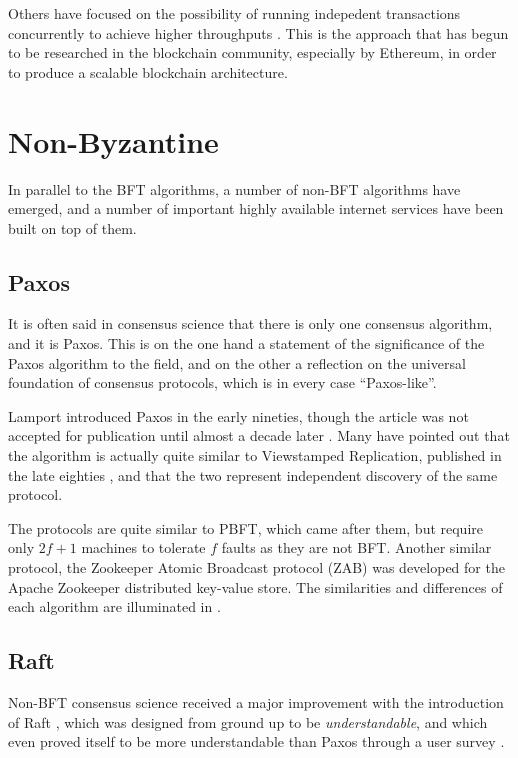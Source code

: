Others have focused on the possibility of running indepedent transactions concurrently to achieve higher throughputs \cite{kotla2004high}.
This is the approach that has begun to be researched in the blockchain community, especially by Ethereum, in order to produce a scalable blockchain architecture.

\section{Non-Byzantine}

In parallel to the BFT algorithms, a number of non-BFT algorithms have emerged, and a 
number of important highly available internet services have been built on top of them.

\subsection{Paxos}

It is often said in consensus science that there is only one consensus algorithm, and it is Paxos.
This is on the one hand a statement of the significance of the Paxos algorithm to the field,
and on the other a reflection on the universal foundation of consensus protocols,
which is in every case ``Paxos-like''.

Lamport introduced Paxos in the early nineties, though the article was not accepted for publication until 
almost a decade later \cite{paxos}.
Many have pointed out that the algorithm is actually quite similar to Viewstamped Replication,
published in the late eighties \cite{oki1988viewstamped},
and that the two represent independent discovery of the same protocol.

The protocols are quite similar to PBFT, which came after them, 
but require only $2f+1$ machines to tolerate $f$ faults as they are not BFT.
Another similar protocol, the Zookeeper Atomic Broadcast protocol (ZAB) \cite{junqueria2011zab}
was developed for the Apache Zookeeper distributed key-value store.
The similarities and differences of each algorithm are illuminated in \cite{van2015vive}.

\subsection{Raft} 

Non-BFT consensus science received a major improvement with the introduction of Raft \cite{raft},
which was designed from ground up to be \emph{understandable}, 
and which even proved itself to be more understandable than Paxos through a user survey \cite{raft_thesis}.

